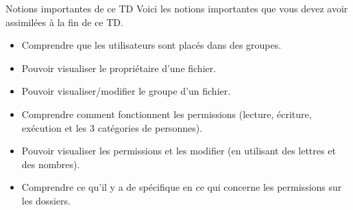 \documentclass[a4paper,11pt]{style-esi/td}
\begin{document}
	\begin{theorie}{Notions importantes de ce TD}
		Voici les notions importantes que vous devez avoir assimilées à la fin de ce TD.
		\begin{itemize}
		\item 
			Comprendre que les utilisateurs sont placés dans des groupes.
		\item 
			Pouvoir visualiser le propriétaire d'une fichier.
		\item 
			Pouvoir visualiser/modifier le groupe d'un fichier.
		\item 
			Comprendre comment fonctionnent les permissions
			(lecture, écriture, exécution et les 3 catégories de personnes).
		\item 
			Pouvoir visualiser les permissions
			et les modifier (en utilisant des lettres et des nombres).
		\item 
			Comprendre ce qu'il y a de spécifique en ce qui concerne les permissions
			sur les dossiers.
		\end{itemize}
	\end{theorie}
\end{document}
